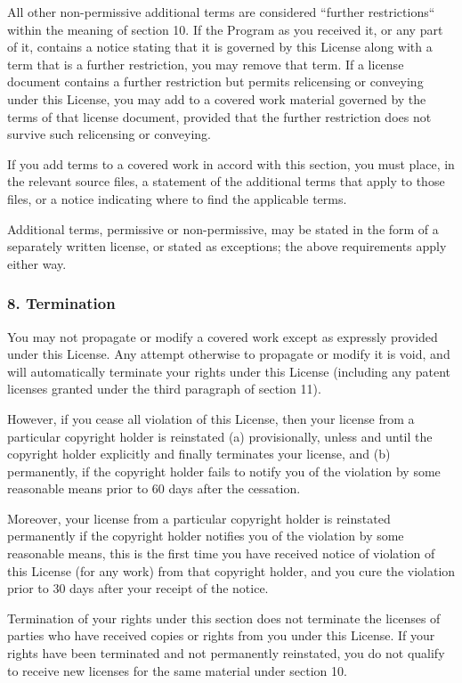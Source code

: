 \documentclass[a4paper, 11pt, twoside]{article}
\begin{document}
All other non-permissive additional terms are considered “further restrictions“ within the meaning of section 10. If the Program as you received it, or any part of it, contains a notice stating that it is governed by this License along with a term that is a further restriction, you may remove that term. If a license document contains a further restriction but permits relicensing or conveying under this License, you may add to a covered work material governed by the terms of that license document, provided that the further restriction does not survive such relicensing or conveying.

If you add terms to a covered work in accord with this section, you must place, in the relevant source files, a statement of the additional terms that apply to those files, or a notice indicating where to find the applicable terms.

Additional terms, permissive or non-permissive, may be stated in the form of a separately written license, or stated as exceptions; the above requirements apply either way.

\subsubsection{8. Termination}

You may not propagate or modify a covered work except as expressly provided under this License. Any attempt otherwise to propagate or modify it is void, and will automatically terminate your rights under this License (including any patent licenses granted under the third paragraph of section 11).

However, if you cease all violation of this License, then your license from a particular copyright holder is reinstated (a) provisionally, unless and until the copyright holder explicitly and finally terminates your license, and (b) permanently, if the copyright holder fails to notify you of the violation by some reasonable means prior to 60 days after the cessation.

Moreover, your license from a particular copyright holder is reinstated permanently if the copyright holder notifies you of the violation by some reasonable means, this is the first time you have received notice of violation of this License (for any work) from that copyright holder, and you cure the violation prior to 30 days after your receipt of the notice.

Termination of your rights under this section does not terminate the licenses of parties who have received copies or rights from you under this License. If your rights have been terminated and not permanently reinstated, you do not qualify to receive new licenses for the same material under section 10.
\end{document}
